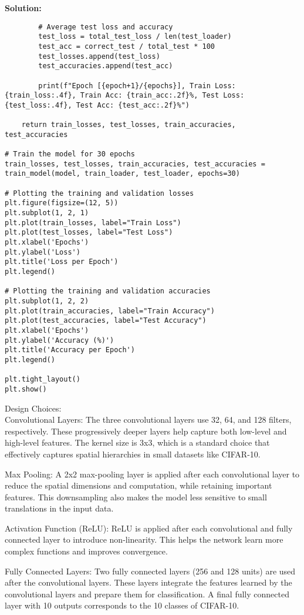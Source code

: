 \documentclass{article}
\newenvironment{solution}{\color{blue} \smallskip \textbf{Solution:}}{}
\begin{document}
\begin{solution}
\begin{verbatim}
        # Average test loss and accuracy
        test_loss = total_test_loss / len(test_loader)
        test_acc = correct_test / total_test * 100
        test_losses.append(test_loss)
        test_accuracies.append(test_acc)

        print(f"Epoch [{epoch+1}/{epochs}], Train Loss: {train_loss:.4f}, Train Acc: {train_acc:.2f}%, Test Loss: {test_loss:.4f}, Test Acc: {test_acc:.2f}%")

    return train_losses, test_losses, train_accuracies, test_accuracies

# Train the model for 30 epochs
train_losses, test_losses, train_accuracies, test_accuracies = train_model(model, train_loader, test_loader, epochs=30)

# Plotting the training and validation losses
plt.figure(figsize=(12, 5))
plt.subplot(1, 2, 1)
plt.plot(train_losses, label="Train Loss")
plt.plot(test_losses, label="Test Loss")
plt.xlabel('Epochs')
plt.ylabel('Loss')
plt.title('Loss per Epoch')
plt.legend()

# Plotting the training and validation accuracies
plt.subplot(1, 2, 2)
plt.plot(train_accuracies, label="Train Accuracy")
plt.plot(test_accuracies, label="Test Accuracy")
plt.xlabel('Epochs')
plt.ylabel('Accuracy (%)')
plt.title('Accuracy per Epoch')
plt.legend()

plt.tight_layout()
plt.show()

\end{verbatim}

Design Choices:\\
Convolutional Layers: The three convolutional layers use 32, 64, and 128 filters, respectively. These progressively deeper layers help capture both low-level and high-level features. The kernel size is 3x3, which is a standard choice that effectively captures spatial hierarchies in small datasets like CIFAR-10.

Max Pooling: A 2x2 max-pooling layer is applied after each convolutional layer to reduce the spatial dimensions and computation, while retaining important features. This downsampling also makes the model less sensitive to small translations in the input data.

Activation Function (ReLU): ReLU is applied after each convolutional and fully connected layer to introduce non-linearity. This helps the network learn more complex functions and improves convergence.

Fully Connected Layers: Two fully connected layers (256 and 128 units) are used after the convolutional layers. These layers integrate the features learned by the convolutional layers and prepare them for classification. A final fully connected layer with 10 outputs corresponds to the 10 classes of CIFAR-10.


\end{solution}
\end{document}
